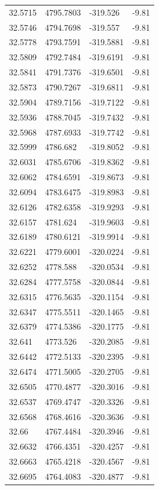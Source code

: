 \begin{table}[H]
\begin{tabular}{llll}
32.5715 & 4795.7803 & -319.526 & -9.81 \\
32.5746 & 4794.7698 & -319.557 & -9.81 \\
32.5778 & 4793.7591 & -319.5881 & -9.81 \\
32.5809 & 4792.7484 & -319.6191 & -9.81 \\
32.5841 & 4791.7376 & -319.6501 & -9.81 \\
32.5873 & 4790.7267 & -319.6811 & -9.81 \\
32.5904 & 4789.7156 & -319.7122 & -9.81 \\
32.5936 & 4788.7045 & -319.7432 & -9.81 \\
32.5968 & 4787.6933 & -319.7742 & -9.81 \\
32.5999 & 4786.682 & -319.8052 & -9.81 \\
32.6031 & 4785.6706 & -319.8362 & -9.81 \\
32.6062 & 4784.6591 & -319.8673 & -9.81 \\
32.6094 & 4783.6475 & -319.8983 & -9.81 \\
32.6126 & 4782.6358 & -319.9293 & -9.81 \\
32.6157 & 4781.624 & -319.9603 & -9.81 \\
32.6189 & 4780.6121 & -319.9914 & -9.81 \\
32.6221 & 4779.6001 & -320.0224 & -9.81 \\
32.6252 & 4778.588 & -320.0534 & -9.81 \\
32.6284 & 4777.5758 & -320.0844 & -9.81 \\
32.6315 & 4776.5635 & -320.1154 & -9.81 \\
32.6347 & 4775.5511 & -320.1465 & -9.81 \\
32.6379 & 4774.5386 & -320.1775 & -9.81 \\
32.641 & 4773.526 & -320.2085 & -9.81 \\
32.6442 & 4772.5133 & -320.2395 & -9.81 \\
32.6474 & 4771.5005 & -320.2705 & -9.81 \\
32.6505 & 4770.4877 & -320.3016 & -9.81 \\
32.6537 & 4769.4747 & -320.3326 & -9.81 \\
32.6568 & 4768.4616 & -320.3636 & -9.81 \\
32.66 & 4767.4484 & -320.3946 & -9.81 \\
32.6632 & 4766.4351 & -320.4257 & -9.81 \\
32.6663 & 4765.4218 & -320.4567 & -9.81 \\
32.6695 & 4764.4083 & -320.4877 & -9.81 \\

\end{tabular}
\end{table}
